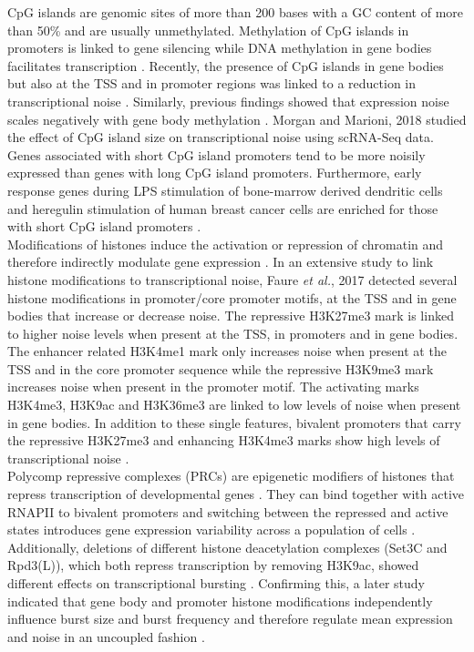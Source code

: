 CpG islands are genomic sites of more than 200 bases with a GC content of more than 50\% and are usually unmethylated. Methylation of CpG islands in promoters is linked to gene silencing while DNA methylation in gene bodies facilitates transcription \citep{Portela2010}.  Recently, the presence of CpG islands in gene bodies but also at the TSS and in promoter regions was linked to a reduction in transcriptional noise \citep{Faure2017}. Similarly, previous findings showed that expression noise scales negatively with gene body methylation \cite{Huh2013}. Morgan and Marioni, 2018 studied the effect of CpG island size on transcriptional noise using scRNA-Seq data. Genes associated with short CpG island promoters tend to be more noisily expressed than genes with long CpG island promoters. Furthermore, early response genes during \gls{LPS} stimulation of bone-marrow derived dendritic cells and heregulin stimulation of human breast cancer cells are enriched for those with short CpG island promoters \citep{Morgan2018}. \\

Modifications of histones induce the activation or repression of chromatin and  therefore indirectly modulate gene expression \citep{Suganuma2011}. In an extensive study to link histone modifications to transcriptional noise, Faure \textit{et al.}, 2017 detected several histone modifications in promoter/core promoter motifs, at the TSS and in gene bodies that increase or decrease noise. The repressive \gls{H3K27me3} mark is linked to higher noise levels when present at the TSS, in promoters and in gene bodies. The enhancer related \gls{H3K4me1} mark only increases noise when present at the TSS and in the core promoter sequence while the repressive \gls{H3K9me3} mark increases noise when present in the promoter motif. The activating marks \gls{H3K4me3}, \gls{H3K9ac} and \gls{H3K36me3} are linked to low levels of noise when present in gene bodies. In addition to these single features, bivalent promoters that carry the repressive \gls{H3K27me3} and enhancing \gls{H3K4me3} marks show high levels of transcriptional noise \citep{Faure2017}.\\ 

Polycomp repressive complexes (PRCs) are epigenetic modifiers of histones that repress transcription of developmental genes \citep{Chittock2017}. They can bind together with active \gls{RNAPII} to bivalent promoters and switching between the repressed and active states introduces gene expression variability across a population of cells \cite{Kar2017}. Additionally, deletions of different histone deacetylation complexes (Set3C and Rpd3(L)), which both repress transcription by removing H3K9ac, showed different effects on transcriptional bursting \citep{Weinberger2012}.  Confirming this, a later study indicated that gene body and promoter histone modifications independently influence burst size and burst frequency and therefore regulate mean expression and noise in an uncoupled fashion \cite{Wu2017}. \\

